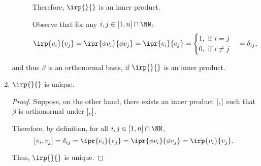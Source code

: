 \documentclass[11pt]{scrartcl}
\begin{document}
\begin{enumerate}[label=\alph*)]
\begin{description}
  Therefore, $\irp{\*}{\*}$ is an inner product.

  Observe that for any $i, j\in[1,n]\cap \NN$:
\[\irp{v_i}{v_j}= \ipr{\phi v_i}{\phi v_j} = \ipr{e_i}{e_j} = 
  \begin{cases}
    1, \text{ if $i=j$}\\
    0, \text{ if $i\neq j$}
  \end{cases} = \delta_{ij},
\]
\end{description}

and thus $\beta$ is an orthonormal basis, if $\irp{\*}{\*}$ is an inner product.

\item
  \begin{claim*}
    $\irp{\*}{\*}$ is unique.
  \end{claim*}
  \begin{proof}
    Suppose, on the other hand, there exists an inner product $[\*,\*]$ such that $\beta$ is orthonormal under $[\*,\*]$.

    Therefore, by definition, for all $i, j \in [1,n]\cap \NN$,
    \[
      [v_i, v_j] = \delta_{ij} = \ipr{e_i}{e_j} = \ipr{\phi v_i}{\phi v_j} = \irp{v_i}{v_j}.\]

  Thus, $\irp{\*}{\*}$ is unique.
  \end{proof}



\end{enumerate}
\end{document}
